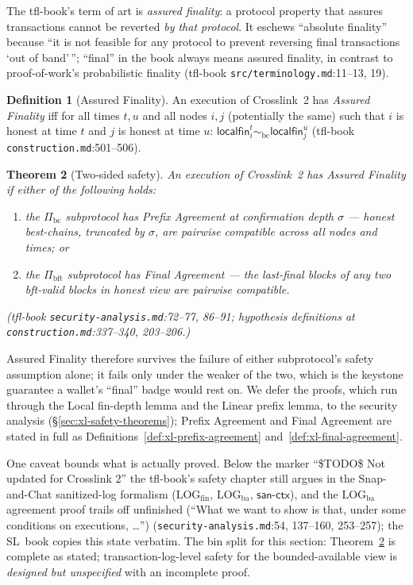 \documentclass[11pt,a4paper]{article}
\newtheorem{theorem}{Theorem}[section]
\theoremstyle{definition}
\newtheorem{definition}[theorem]{Definition}
\begin{document}
The tfl-book's term of art is \emph{assured finality}: a protocol property
that assures transactions cannot be reverted \emph{by that protocol}. It
eschews ``absolute finality'' because ``it is not feasible for any protocol
to prevent reversing final transactions `out of band'\,''; ``final'' in the
book always means assured finality, in contrast to proof-of-work's
probabilistic finality (tfl-book \texttt{src/terminology.md}:11--13, 19).

\begin{definition}[Assured Finality]\label{def:xl-assured-finality-wallet}
An execution of Crosslink~2 has \emph{Assured Finality} iff for all times
$t, u$ and all nodes $i, j$ (potentially the same) such that $i$ is honest
at time $t$ and $j$ is honest at time $u$: $\mathsf{localfin}_i^t
\sim_{\mathrm{bc}} \mathsf{localfin}_j^u$ (tfl-book
\texttt{construction.md}:501--506).
\end{definition}

\begin{theorem}[Two-sided safety]\label{thm:xl-af-two-sided}
An execution of Crosslink~2 has Assured Finality if \emph{either} of the
following holds:
\begin{enumerate}[label=(\roman*)]
\item the $\Pi_{\mathrm{bc}}$ subprotocol has Prefix Agreement at
  confirmation depth $\sigma$ --- honest best-chains, truncated by
  $\sigma$, are pairwise compatible across all nodes and times; or
\item the $\Pi_{\mathrm{bft}}$ subprotocol has Final Agreement --- the
  last-final blocks of any two bft-valid blocks in honest view are
  pairwise compatible.
\end{enumerate}
(tfl-book \texttt{security-analysis.md}:72--77, 86--91;
hypothesis definitions at \texttt{construction.md}:337--340, 203--206.)
\end{theorem}

Assured Finality therefore survives the failure of either subprotocol's
safety assumption alone; it fails only under the weaker of the two, which
is the keystone guarantee a wallet's ``final'' badge would rest on. We
defer the proofs, which run through the Local fin-depth lemma and the
Linear prefix lemma, to the security analysis
(\S\ref{sec:xl-safety-theorems}); Prefix Agreement and Final Agreement
are stated in full as Definitions~\ref{def:xl-prefix-agreement}
and~\ref{def:xl-final-agreement}.

One caveat bounds what is actually proved. Below the marker ``\$TODO\$ Not
updated for Crosslink 2'' the tfl-book's safety chapter still argues in the
Snap-and-Chat sanitized-log formalism ($\mathrm{LOG}_{\mathrm{fin}}$,
$\mathrm{LOG}_{\mathrm{ba}}$, $\mathsf{san\text{-}ctx}$), and the
$\mathrm{LOG}_{\mathrm{ba}}$ agreement proof trails off unfinished (``What
we want to show is that, under some conditions on executions, \ldots'')
(\texttt{security-analysis.md}:54, 137--160, 253--257); the SL~book copies
this state verbatim. The bin split for this section:
Theorem~\ref{thm:xl-af-two-sided} is complete as stated;
transaction-log-level safety for the bounded-available view is
\emph{designed but unspecified} with an incomplete proof.
\end{document}
